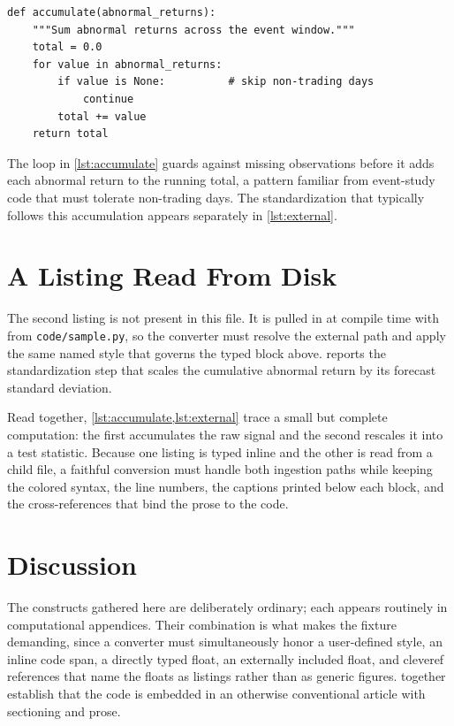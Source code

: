 \documentclass[11pt]{article}
\begin{document}
\begin{lstlisting}[caption={Accumulating an abnormal return over the event window},label={lst:accumulate}]
def accumulate(abnormal_returns):
    """Sum abnormal returns across the event window."""
    total = 0.0
    for value in abnormal_returns:
        if value is None:          # skip non-trading days
            continue
        total += value
    return total
\end{lstlisting}

The loop in \cref{lst:accumulate} guards against missing observations before it
adds each abnormal return to the running total, a pattern familiar from
event-study code that must tolerate non-trading days. The standardization that
typically follows this accumulation appears separately in \cref{lst:external}.

\section{A Listing Read From Disk}
\label{sec:external}

The second listing is not present in this file. It is pulled in at compile time
with \verb|| from \texttt{code/sample.py}, so the converter must
resolve the external path and apply the same named style that governs the typed
block above.  reports the standardization step that scales the
cumulative abnormal return by its forecast standard deviation.



Read together, \cref{lst:accumulate,lst:external} trace a small but complete
computation: the first accumulates the raw signal and the second rescales it into
a test statistic. Because one listing is typed inline and the other is read from
a child file, a faithful conversion must handle both ingestion paths while
keeping the colored syntax, the line numbers, the captions printed below each
block, and the cross-references that bind the prose to the code.

\section{Discussion}
\label{sec:discussion}

The constructs gathered here are deliberately ordinary; each appears routinely in
computational appendices. Their combination is what makes the fixture demanding,
since a converter must simultaneously honor a user-defined style, an inline code
span, a directly typed float, an externally included float, and cleveref
references that name the floats as listings rather than as generic figures.
 together establish that the code is
embedded in an otherwise conventional article with sectioning and prose.
\end{document}
